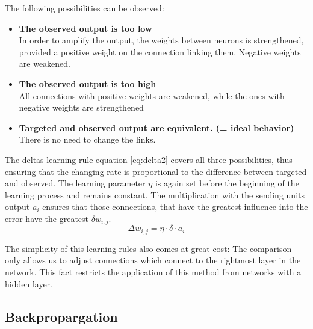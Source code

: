 \documentclass[10pt,a4paper,DIV=11]{scrreprt}
\begin{document}
The following possibilities can be observed:
\begin{itemize}
\item \textbf{The observed output is too low}\\
In order to amplify the output, the weights between neurons is strengthened, provided a positive weight on the connection linking them. Negative weights are weakened.
\item \textbf{The observed output is too high}\\
All connections with positive weights are weakened, while the ones with negative weights are strengthened 
\item \textbf{Targeted and observed output are equivalent. (= ideal behavior)}\\ There is no need to change the links.
\end{itemize}

The deltas learning rule equation \eqref{eq:delta2} covers all three possibilities, thus ensuring that the changing rate is proportional to the difference between targeted and observed. The learning parameter $\eta$ is again set before the beginning of the learning process and remains constant. The multiplication with the sending units output $a_i$ ensures that those connections, that have the greatest influence into the error have the greatest $\delta w_{i,j}$.
\begin{equation}
\Delta w_{i,j} = \eta \cdot \delta \cdot a_i
\label{eq:delta2}
\end{equation}

The simplicity of this learning rules also comes at great cost: The comparison only allows us to adjust connections which connect to the rightmost layer in the network. This fact restricts the application of this method from networks with a hidden layer. 

\subsection{Backpropargation}
\end{document}
